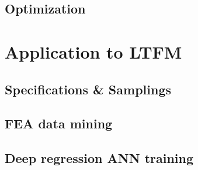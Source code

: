         \subsection{Optimization}                   \label{Chapter:RSM/LFSM/Optimization}
    
    
    \section{Application to \ac{LTFM}}               \label{Chapter:RSM/LTFM}
    
        
        \subsection{Specifications \& Samplings}    \label{Chapter:RSM/LTFM/spec}
        
        
        \subsection{\acs{FEA} data mining}          \label{Chapter:RSM/LTFM/data mining}
        
        
        \subsection{Deep regression ANN training}   \label{Chapter:RSM/LTFM/ANN training}
        
